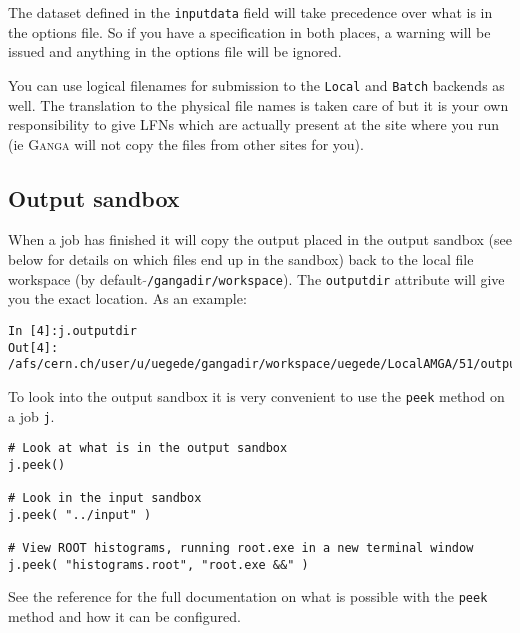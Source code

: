 \documentclass{howto}
\def\ganga {\textsc{Ganga}\xspace}
\begin{document}
\begin{notice}
  The dataset defined in the \texttt{inputdata} field will take precedence
  over what is in the options file. So if you have a specification in both
  places, a warning will be issued and anything in the options file will be
  ignored.
\end{notice}

You can use logical filenames for submission to the \texttt{Local} and
\texttt{Batch} backends as well. The translation to the physical file names is
taken care of but it is your own responsibility to give LFNs which are
actually present at the site where you run (ie \ganga will not copy the files
from other sites for you).

\subsection{Output sandbox}
\label{sec:OutputSandbox}
When a job has finished it will copy the output placed in the output sandbox 
(see below for details on which files end up in the sandbox)
back to the local file
workspace (by default \texttt{$\tilde{}$/gangadir/workspace}). The
\texttt{outputdir} attribute will give you the exact location. As an example:
\begin{verbatim}
In [4]:j.outputdir
Out[4]: /afs/cern.ch/user/u/uegede/gangadir/workspace/uegede/LocalAMGA/51/output
\end{verbatim}

To look into the output sandbox it is very convenient to use the \texttt{peek}
method on a job \texttt{j}.
\begin{verbatim}
# Look at what is in the output sandbox
j.peek()

# Look in the input sandbox
j.peek( "../input" )

# View ROOT histograms, running root.exe in a new terminal window
j.peek( "histograms.root", "root.exe &&" )
\end{verbatim}

See the reference for the full documentation on what is possible with the
\texttt{peek} method and how it can be configured.
\end{document}

